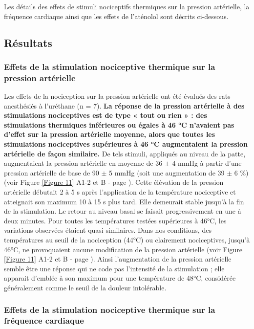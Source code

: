 \documentclass[a4paper,12pt,twoside]{report}
\begin{document}
Les détails des effets de stimuli nociceptifs thermiques sur la pression artérielle, la fréquence cardiaque ainsi que les effets de l’aténolol sont décrits ci-dessous.

\subsection{Résultats}

\subsubsection{Effets de la stimulation nociceptive thermique sur la pression artérielle}

Les effets de la nociception sur la pression artérielle ont été évalués des rats anesthésiés à l’uréthane (n = 7). \textbf{La réponse de la pression artérielle à des stimulations nociceptives est de type « tout ou rien » : des stimulations thermiques inférieures ou égales à 46 °C n’avaient pas d’effet sur la pression artérielle moyenne, alors que toutes les stimulations nociceptives supérieures à 46 °C augmentaient la pression artérielle de façon similaire.} De tels stimuli, appliqués au niveau de la patte, augmentaient la pression artérielle en moyenne de 36 $\pm$ 4 mmHg à partir d'une pression artérielle de base de 90 $\pm$ 5 mmHg (soit une augmentation de 39 $\pm$ 6 \%) (voir Figure \ref{Figure 11} A1-2 et B - page \pageref{Figure 11}). Cette élévation de la pression artérielle débutait 2 à 5 s après l'application de la température nociceptive et atteignait son maximum 10 à 15 s plus tard. Elle demeurait stable jusqu'à la fin de la stimulation. Le retour au niveau basal se faisait progressivement en une à deux minutes. Pour toutes les températures testées supérieures à 46°C, les variations observées étaient quasi-similaires. Dans nos conditions, des températures au seuil de la nociception (44°C) ou clairement nociceptives, jusqu'à 46°C, ne provoquaient aucune modification de la pression artérielle (voir Figure \ref{Figure 11} A1-2 et B - page \pageref{Figure 11}). Ainsi l'augmentation de la pression artérielle semble être une réponse qui ne code pas l'intensité de la stimulation ; elle apparait d'emblée à son maximum pour une température de 48°C, considérée généralement comme le seuil de la douleur intolérable.

\subsubsection{Effets de la stimulation nociceptive thermique sur la fréquence cardiaque}
\end{document}
